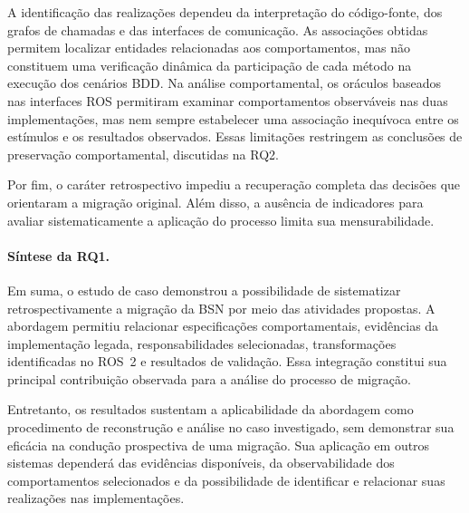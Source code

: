 A identificação das realizações dependeu da interpretação do código-fonte, dos grafos de chamadas e das interfaces de comunicação. As associações obtidas permitem localizar entidades relacionadas aos comportamentos, mas não constituem uma verificação dinâmica da participação de cada método na execução dos cenários BDD.
Na análise comportamental, os oráculos baseados nas interfaces ROS permitiram examinar comportamentos observáveis nas duas implementações, mas nem sempre estabelecer uma associação inequívoca entre os estímulos e os resultados observados. Essas limitações restringem as conclusões de preservação comportamental, discutidas na RQ2.

Por fim, o caráter retrospectivo impediu a recuperação completa das decisões que orientaram a migração original. Além disso, a ausência de indicadores para avaliar sistematicamente a aplicação do processo limita sua mensurabilidade. 

\paragraph{Síntese da RQ1.}

Em suma, o estudo de caso demonstrou a possibilidade de sistematizar retrospectivamente a migração da BSN por meio das atividades propostas. A abordagem permitiu relacionar especificações comportamentais, evidências da implementação legada, responsabilidades selecionadas, transformações identificadas no ROS~2 e resultados de validação. Essa integração constitui sua principal contribuição observada para a análise do processo de migração.

Entretanto, os resultados sustentam a aplicabilidade da abordagem como procedimento de reconstrução e análise no caso investigado, sem demonstrar sua eficácia na condução prospectiva de uma migração. Sua aplicação em outros sistemas dependerá das evidências disponíveis, da observabilidade dos comportamentos selecionados e da possibilidade de identificar e relacionar suas realizações nas implementações.





